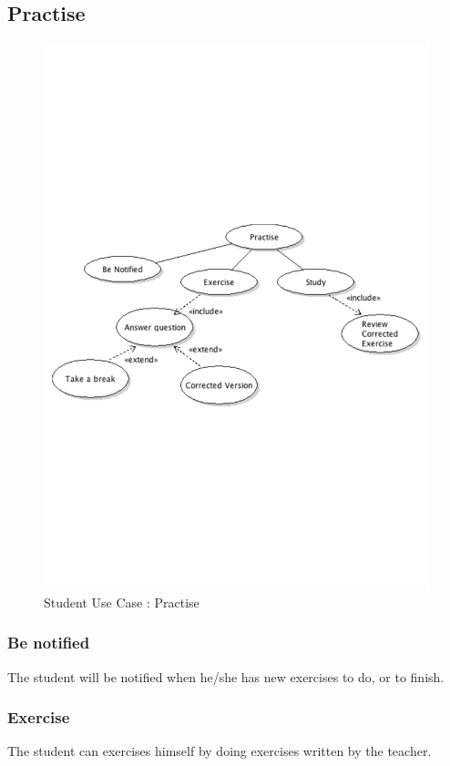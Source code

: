 	\subsection{Practise}
		\begin{figure}[ht]
			\begin{center}
				\includegraphics[width=\textwidth,  trim=2cm 10cm 2cm 11cm]{UML_figure/UC/student/UC_Student_Practise.pdf}
				\caption{Student Use Case : Practise}
			\end{center}
		\end{figure}
		\subsubsection{Be notified}
			The student will be notified when he/she has new exercises to do, or to finish.
		\subsubsection{Exercise}
			The student can exercises himself by doing exercises written by the teacher.
